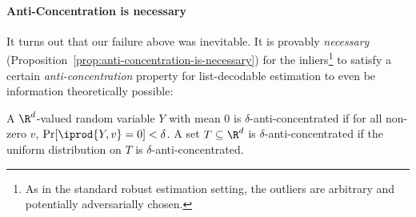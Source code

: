 \paragraph{Anti-Concentration is necessary} It turns out that our failure above was inevitable. It is provably \emph{necessary} (Proposition~\ref{prop:anti-concentration-is-necessary}) for the inliers\footnote{As in the standard robust estimation setting, the outliers are  arbitrary and potentially adversarially chosen.} to satisfy a certain \emph{anti-concentration} property for list-decodable estimation to even be information theoretically possible:

\begin{definition}
A $\R^d$-valued random variable $Y$ with mean $0$ is $\delta$-anti-concentrated if for all non-zero $v$, $\Pr[ \iprod{Y,v} = 0 ] < \delta$. A set $T \subseteq \R^d$ is $\delta$-anti-concentrated if the uniform distribution on $T$ is $\delta$-anti-concentrated.
\end{definition}


 












